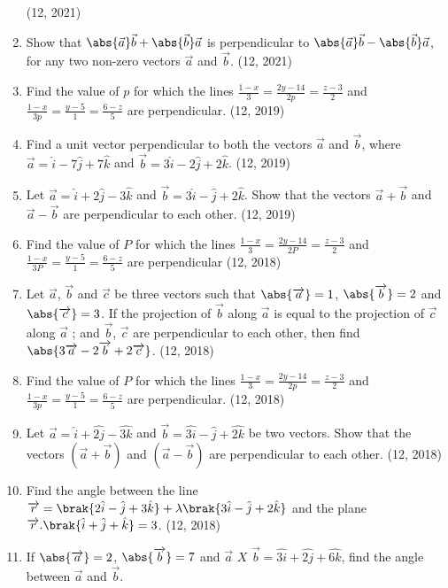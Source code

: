 \begin{enumerate}[label=\thesubsection.\arabic*, ref=\thesubsection.\theenumi]
		\hfill (12, 2021)
%	
	\item Show that $\abs{\vec{a}} \vec{b} + \abs{\vec{b}} \vec{a}$ is perpendicular to $\abs{\vec{a}} \vec{b} - \abs{\vec{b}} \vec{a}$, for any two non-zero vectors $\vec{a}$ and $\vec{b}$. \hfill (12, 2021)
	\item Find the value of $p$ for which the lines 
	$\frac{1-x}{3} = \frac{2y-14}{2p} = \frac{z-3}{2}$ and $\frac{1-x}{3p} = \frac{y-5}{1} = \frac{6-z}{5}$
		are perpendicular.
 \hfill (12, 2019)
%	
	\item Find a unit vector perpendicular to both the vectors $\overrightarrow{a}$ and $\overrightarrow{b}$, where $\overrightarrow{a} = \hat{i} - 7\hat{j} + 7\hat{k}$ and $\overrightarrow{b} = 3\hat{i} - 2\hat{j} + 2\hat{k}$. \hfill (12, 2019)
	\item Let $\overrightarrow{a} = \hat{i} + 2\hat{j} - 3\hat{k}$ and $\overrightarrow{b} = 3\hat{i} - \hat{j} + 2\hat{k}$. Show that the vectors $\overrightarrow{a} + \overrightarrow{b}$ and $\overrightarrow{a} - \overrightarrow{b}$ are perpendicular to each other. \hfill (12, 2019)
\item Find the value of $P$ for which the lines 
$\frac{1 - x}{3} = \frac{2y - 14}{2P} = \frac{z - 3}{2}$
and
$\frac{1 - x}{3P} = \frac{y - 5}{1} = \frac{6 - z}{5}$
are perpendicular
\hfill (12, 2018)
 \item Let $\overrightarrow{a}$, $\overrightarrow{b} $ and $\overrightarrow{c}$ be three vectors such that $\abs{\overrightarrow{a}}=1$, $\abs {\overrightarrow{b}}=2 $ and $\abs{\overrightarrow{c}}=3$. If the projection of $\overrightarrow{b}$ along $\overrightarrow{a}$ is equal to the projection of $\overrightarrow{c}$ along $\overrightarrow{a}$ ; and $\overrightarrow{b}$, $\overrightarrow{c}$ are perpendicular to each other, then find $\abs{3\overrightarrow{a}- 2\overrightarrow{b} +2\overrightarrow{c}}$.
\hfill (12, 2018)
\item Find the value of $P$ for which the lines 
$ \frac{1-x}{3}=\frac{2y-14}{2p}=\frac{z-3}{2}$ and $\frac{1-x}{3p}=\frac{y-5}{1}=\frac{6-z}{5}$
are perpendicular.
 \hfill (12, 2018)
\item Let $\vec{a}=\hat{i}+\hat{2j}-\hat{3k}$ and $\vec{b}=\hat{3i}-\hat{j}+\hat{2k}$ be two vectors. Show that the vectors $(\vec{a}+\vec{b})$ and $(\vec{a}-\vec{b})$ are perpendicular to each other.
\hfill (12, 2018)
\item Find the angle between the line $\overrightarrow{r}=\brak{2\hat{i}-\hat{j}+3\hat{k}}+\lambda\brak{3\hat{i}-\hat{j}+2\hat{k}}$ and the plane $\overrightarrow{r}.\brak{\hat{i}+\hat{j}+\hat{k}}=3$.
\hfill (12, 2018) 
\item If $\abs{\overrightarrow{a}}=2$, $\abs{\overrightarrow{b}}=7$ and  $\overrightarrow{a}$ $X$ $\overrightarrow{b} =\hat{3i}+\hat{2j}+\hat{6k}$, find the angle between $\overrightarrow{a}$ and $\overrightarrow{b}$.


\end{enumerate}
